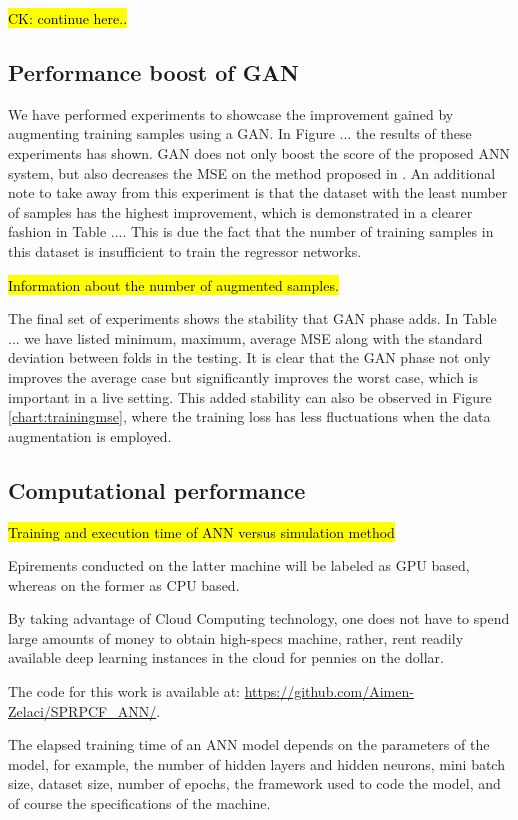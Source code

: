\documentclass[draft, 10pt]{IEEEtran}
\begin{document}
\hl{CK: continue here..}

\subsection{Performance boost of GAN}

We have performed experiments to showcase the improvement gained by augmenting training samples using a GAN. In Figure ... the results of these experiments has shown. GAN does not only boost the score of the proposed ANN system, but also decreases the MSE on the method proposed in \cite{paper0}. An additional note to take away from this experiment is that the dataset with the least number of samples has the highest improvement, which is demonstrated in a clearer fashion in Table .... This is due the fact that the number of training samples in this dataset is insufficient to train the regressor networks.

\hl{Information about the number of augmented samples.}




The final set of experiments shows the stability that GAN phase adds. In Table ... we have listed minimum, maximum, average MSE along with the standard deviation between folds in the testing. It is clear that the GAN phase not only improves the average case but significantly improves the worst case, which is important in a live setting. This added stability can also be observed in Figure \ref{chart:trainingmse}, where the training loss has less fluctuations when the data augmentation is employed.



\subsection{Computational performance}

\hl{Training and execution time of ANN versus simulation method}


Epirements conducted on the latter machine will be labeled as GPU based, whereas on the former as CPU based.

By taking advantage of Cloud Computing technology, one does not have to spend large amounts of money to obtain high-specs machine, rather, rent readily available deep learning instances in the cloud for pennies on the dollar. 

The code for this work is available at: \url{https://github.com/Aimen-Zelaci/SPRPCF_ANN/}.

The elapsed training time of an ANN model depends on the parameters of the model, for example, the number of hidden layers and hidden neurons, mini batch size, dataset size, number of epochs, the framework used to code the model, and of course the specifications of the machine.
\end{document}
